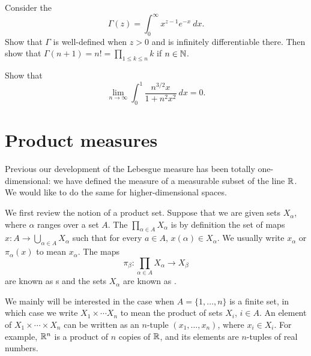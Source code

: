 \begin{exercise}
Consider the 
\[\Gamma(z) = \int_{0}^{\infty} x^{z - 1} e^{-x} ~dx.\]
Show that $\Gamma$ is well-defined when $z > 0$ and is infinitely differentiable there. Then show that $\Gamma(n + 1) = n! = \prod_{1\le k\le n} k$ if $n \in \mathbb{N}$.
\end{exercise}

\begin{exercise}
Show that
\[\lim_{n \to \infty} \int_{0}^{1} \frac{n^{3/2} x}{1 + n^{2} x^{2}} ~dx = 0.\]
\end{exercise}

\section{Product measures}
Previous our development of the Lebesgue measure has been totally one-dimensional: we have defined the measure of a measurable subset of the line $\mathbb{R}$.
We would like to do the same for higher-dimensional spaces.

We first review the notion of a product set. Suppose that we are given sets $X_{\alpha}$, where $\alpha$ ranges over a set $A$.
The  $\prod_{\alpha \in A} X_{\alpha}$ is by definition the set of maps $x: A \to \bigcup_{\alpha \in A} X_{\alpha}$ such that for every $a \in A$, $x(\alpha) \in X_{\alpha}$.
We usually write $x_{\alpha}$ or $\pi_{\alpha}(x)$ to mean $x_{\alpha}$. The maps
\[\pi_{\beta}: \prod_{\alpha \in A} X_{\alpha} \to X_{\beta}\]
are known as s and the sets $X_{\alpha}$ are known as .

We mainly will be interested in the case when $A = \{1, \dots, n\}$ is a finite set, in which case we write $X_{1} \times \cdots X_{n}$ to mean the product of sets $X_{i}$, $i \in A$.
An element of $X_{1} \times \cdots \times X_{n}$ can be written as an $n$-tuple $(x_{1}, \dots, x_{n})$, where $x_{i} \in X_{i}$.
For example, $\mathbb{R}^{n}$ is a product of $n$ copies of $\mathbb{R}$, and its elements are $n$-tuples of real numbers.

